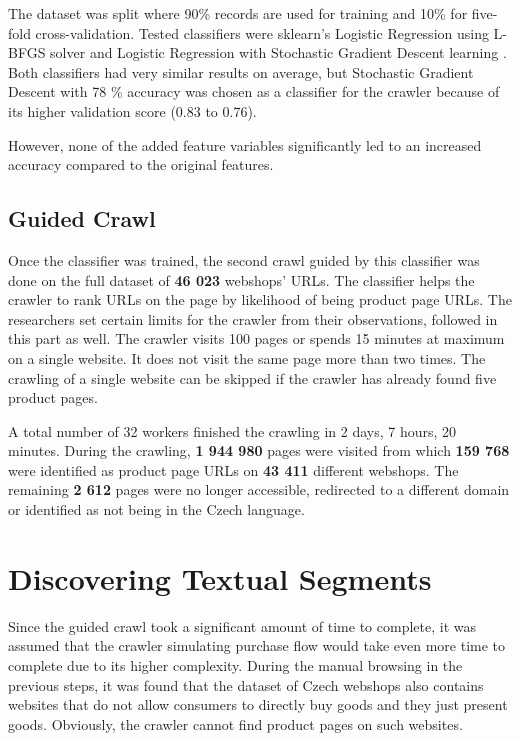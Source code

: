         The dataset was split where 90\% records are used for training and 10\% for five-fold cross-validation. Tested classifiers were sklearn's Logistic Regression using L-BFGS solver\cite{logistic-sklearn} and Logistic Regression with Stochastic Gradient Descent learning \cite{sgd-sklearn}. Both classifiers had very similar results on average, but Stochastic Gradient Descent with 78 \% accuracy was chosen as a classifier for the crawler because of its higher validation score (0.83 to 0.76).

        However, none of the added feature variables significantly led to an increased accuracy compared to the original features.

        \subsection{Guided Crawl}

        Once the classifier was trained, the second crawl guided by this classifier was done on the full dataset of \textbf{46 023} webshops' URLs. The classifier helps the crawler to rank URLs on the page by likelihood of being product page URLs. The researchers set certain limits for the crawler from their observations, followed in this part as well. The crawler visits 100 pages or spends 15 minutes at maximum on a single website. It does not visit the same page more than two times. The crawling of a single website can be skipped if the crawler has already found five product pages.

        A total number of 32 workers finished the crawling in 2 days, 7 hours, 20 minutes. During the crawling, \textbf{1 944 980} pages were visited from which \textbf{159 768} were identified as product page URLs on \textbf{43 411} different webshops. The remaining \textbf{2 612} pages were no longer accessible, redirected to a different domain or identified as not being in the Czech language.

    \section{Discovering Textual Segments}
        Since the guided crawl took a significant amount of time to complete, it was assumed that the crawler simulating purchase flow would take even more time to complete due to its higher complexity. During the manual browsing in the previous steps, it was found that the dataset of Czech webshops also contains websites that do not allow consumers to directly buy goods and they just present goods. Obviously, the crawler cannot find product pages on such websites. 

